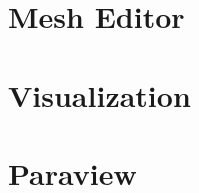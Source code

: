 \documentclass{report}
\begin{document}
\chapter{Mesh Editor}
\graphicspath{{../../meshEditor/src/}}



%

\chapter{Visualization}
\graphicspath{{../../visualization/src/}}


\chapter{Paraview}
\graphicspath{{../../paraviewTutorial/src/}}

\end{document}
